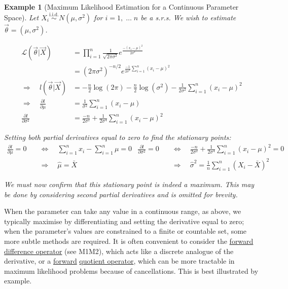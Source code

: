 \documentclass[12pt,a4paper]{article}
\newtheorem{ex}[thm]{Example}
\begin{document}
\begin{ex}[Maximum Likelihood Estimation for a Continuous Parameter Space]\vspace{1cm}

Let $X_i \overset{\text{i.i.d.}}{\sim} N(\mu, \sigma^2)$ for $i = 1,\;\hdots\; n$ be a s.r.s. We wish to estimate $\vec{\theta} = (\mu,\sigma^2)$.

\begin{align*}
\mathcal{L}(\vec{\theta}|\vec{X}) &= \prod_{i=1}^n \frac{1}{\sqrt{2 \pi \sigma^2}} e^{\frac{-(x_i - \mu)^2}{2\sigma^2}}\\
&= (2\pi\sigma^2)^{-n/2} e^{\frac{-1}{2\sigma^2} \sum\limits_{i=1}^n (x_i - \mu)^2}\\
\Rightarrow \quad l(\vec{\theta}|\vec{X}) &= -\frac{n}{2}\log(2\pi) - \frac{n}{2}\log(\sigma^2) - \frac{1}{2\sigma^2} \sum_{i=1}^n (x_i - \mu)^2\\
\Rightarrow\quad \frac{\partial l}{\partial \mu} &= \frac{1}{\sigma^2}\sum_{i=1}^n(x_i - \mu)\\
\frac{\partial l}{\partial \sigma^2} &= \frac{-n}{2\sigma^2} + \frac{1}{2\sigma^4}\sum_{i=1}^n(x_i - \mu)^2
\end{align*}

\noindent Setting both partial derivatives equal to zero to find the stationary points:
\begin{align*}
\frac{\partial l}{\partial \mu} = 0 \quad&\Leftrightarrow\quad \sum_{i=1}^n x_i - \sum_{i=1}^n \mu = 0 & \frac{\partial l}{\partial \sigma^2} = 0 \quad&\Leftrightarrow\quad \frac{-n}{2\sigma^2} + \frac{1}{2\sigma^4}\sum_{i=1}^n (x_i - \mu)^2 = 0\\
&\Rightarrow\quad \hat{\mu} = \bar{X} & &\Rightarrow\quad \hat{\sigma}^2 = \frac{1}{n} \sum_{i=1}^n (X_i - \bar{X})^2
\end{align*}

We must now confirm that this stationary point is indeed a maximum. This may be done by considering second partial derivatives and is omitted for brevity.

\end{ex}

When the parameter can take any value in a continuous range, as above, we typically maximise by differentiating and setting the derivative equal to zero; when the parameter's values are constrained to a finite or countable set, some more subtle methods are required. It is often convenient to consider the \underline{forward difference operator} (see M1M2), which acts like a discrete analogue of the derivative, or a \underline{forward} \underline{quotient operator}, which can be more tractable in maximum likelihood problems because of cancellations. This is best illustrated by example.
\end{document}
